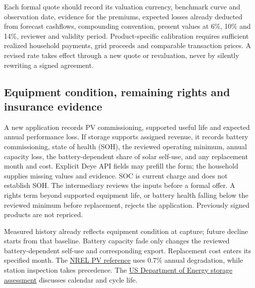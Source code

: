 \documentclass[12pt,a4paper]{article}
\begin{document}
\par{}\par
Each formal quote should record its valuation currency, benchmark curve and observation date, evidence for the premiums, expected losses already deducted from forecast cashflows, compounding convention, present values at 6\%, 10\% and 14\%, reviewer and validity period. Product-specific calibration requires sufficient realized household payments, grid proceeds and comparable transaction prices. A revised rate takes effect through a new quote or revaluation, never by silently rewriting a signed agreement.

\subsection{Equipment condition, remaining rights and insurance evidence}
A new application records PV commissioning, supported useful life and expected annual performance loss. If storage supports assigned revenue, it records battery commissioning, state of health (SOH), the reviewed operating minimum, annual capacity loss, the battery-dependent share of solar self-use, and any replacement month and cost. Explicit Deye API fields may prefill the form; the household supplies missing values and evidence. SOC is current charge and does not establish SOH. The intermediary reviews the inputs before a formal offer. A rights term beyond supported equipment life, or battery health falling below the reviewed minimum before replacement, rejects the application. Previously signed products are not repriced.

Measured history already reflects equipment condition at capture; future decline starts from that baseline. Battery capacity fade only changes the reviewed battery-dependent self-use and corresponding export. Replacement cost enters its specified month. The \href{https://atb.nrel.gov/electricity/2024b/residential_pv}{NREL PV reference} uses 0.7\% annual degradation, while station inspection takes precedence. The \href{https://www.energy.gov/cmei/2022-grid-energy-storage-technology-cost-and-performance-assessment}{US Department of Energy storage assessment} discusses calendar and cycle life.
\end{document}
